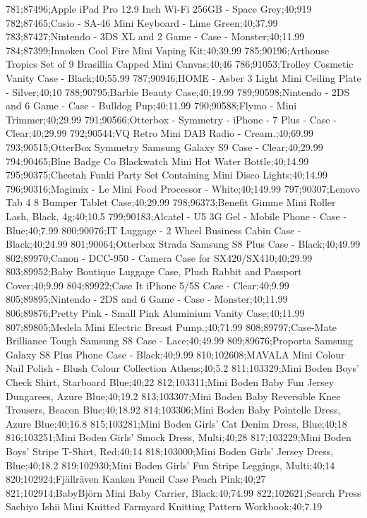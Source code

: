 781;87496;Apple iPad Pro 12.9 Inch Wi-Fi 256GB - Space Grey;40;919
782;87465;Casio - SA-46 Mini Keyboard - Lime Green;40;37.99
783;87427;Nintendo - 3DS XL and 2 Game - Case - Monster;40;11.99
784;87399;Innoken Cool Fire Mini Vaping Kit;40;39.99
785;90196;Arthouse Tropics Set of 9 Brasillia Capped Mini Canvas;40;46
786;91053;Trolley Cosmetic Vanity Case - Black;40;55.99
787;90946;HOME - Asber 3 Light Mini Ceiling Plate - Silver;40;10
788;90795;Barbie Beauty Case;40;19.99
789;90598;Nintendo - 2DS and 6 Game - Case - Bulldog Pup;40;11.99
790;90588;Flymo - Mini Trimmer;40;29.99
791;90566;Otterbox - Symmetry - iPhone - 7 Plus - Case - Clear;40;29.99
792;90544;VQ Retro Mini DAB Radio - Cream.;40;69.99
793;90515;OtterBox Symmetry Samsung Galaxy S9 Case - Clear;40;29.99
794;90465;Blue Badge Co Blackwatch Mini Hot Water Bottle;40;14.99
795;90375;Cheetah Funki Party Set Containing Mini Disco Lights;40;14.99
796;90316;Magimix - Le Mini Food Processor - White;40;149.99
797;90307;Lenovo Tab 4 8 Bumper Tablet Case;40;29.99
798;96373;Benefit Gimme Mini Roller Lash, Black, 4g;40;10.5
799;90183;Alcatel - U5 3G Gel - Mobile Phone - Case - Blue;40;7.99
800;90076;IT Luggage - 2 Wheel Business Cabin Case - Black;40;24.99
801;90064;Otterbox Strada Samsung S8 Plus Case - Black;40;49.99
802;89970;Canon - DCC-950 - Camera Case for SX420/SX410;40;29.99
803;89952;Baby Boutique Luggage Case, Plush Rabbit and Passport Cover;40;9.99
804;89922;Case It iPhone 5/5S Case - Clear;40;9.99
805;89895;Nintendo - 2DS and 6 Game - Case - Monster;40;11.99
806;89876;Pretty Pink - Small Pink Aluminium Vanity Case;40;11.99
807;89805;Medela Mini Electric Breast Pump.;40;71.99
808;89797;Case-Mate Brilliance Tough Samsung S8 Case - Lace;40;49.99
809;89676;Proporta Samsung Galaxy S8 Plus Phone Case - Black;40;9.99
810;102608;MAVALA Mini Colour Nail Polish - Blush Colour Collection Athens;40;5.2
811;103329;Mini Boden Boys' Check Shirt, Starboard Blue;40;22
812;103311;Mini Boden Baby Fun Jersey Dungarees, Azure Blue;40;19.2
813;103307;Mini Boden Baby Reversible Knee Trousers, Beacon Blue;40;18.92
814;103306;Mini Boden Baby Pointelle Dress, Azure Blue;40;16.8
815;103281;Mini Boden Girls' Cat Denim Dress, Blue;40;18
816;103251;Mini Boden Girls' Smock Dress, Multi;40;28
817;103229;Mini Boden Boys' Stripe T-Shirt, Red;40;14
818;103000;Mini Boden Girls' Jersey Dress, Blue;40;18.2
819;102930;Mini Boden Girls' Fun Stripe Leggings, Multi;40;14
820;102924;Fjällräven Kanken Pencil Case Peach Pink;40;27
821;102914;BabyBjörn Mini Baby Carrier, Black;40;74.99
822;102621;Search Press Sachiyo Ishii Mini Knitted Farmyard Knitting Pattern Workbook;40;7.19
